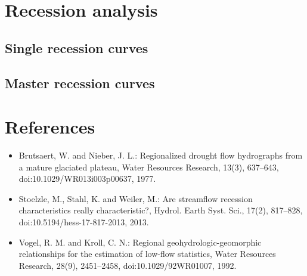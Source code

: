 \documentclass[11pt]{article}
\begin{document}
    \section{Recession analysis}\label{recession-analysis}

\subsection{Single recession curves}\label{single-recession-curves}

\subsection{Master recession curves}\label{master-recession-curves}

    \section{References}\label{references}

\begin{itemize}
\item
  Brutsaert, W. and Nieber, J. L.: Regionalized drought flow hydrographs
  from a mature glaciated plateau, Water Resources Research, 13(3),
  637--643, doi:10.1029/WR013i003p00637, 1977.
\item
  Stoelzle, M., Stahl, K. and Weiler, M.: Are streamflow recession
  characteristics really characteristic?, Hydrol. Earth Syst. Sci.,
  17(2), 817--828, doi:10.5194/hess-17-817-2013, 2013.
\item
  Vogel, R. M. and Kroll, C. N.: Regional geohydrologic-geomorphic
  relationships for the estimation of low-flow statistics, Water
  Resources Research, 28(9), 2451--2458, doi:10.1029/92WR01007, 1992.
\end{itemize}


    
    
    
    
\end{document}
